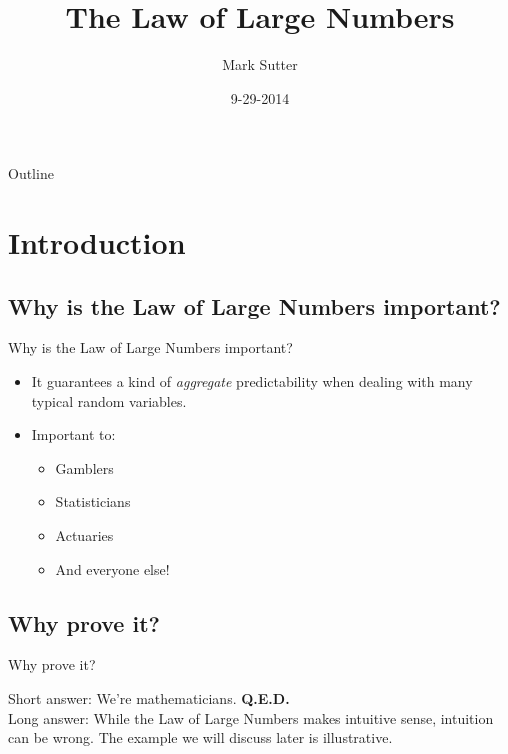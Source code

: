 \documentclass[9pt]{beamer}
\author{Mark Sutter}
\title{The Law of Large Numbers}
\institute{Iowa State University}
\date{9-29-2014}
\begin{document}

\begin{frame}
\titlepage
\end{frame}

\begin{frame}{Outline}
\tableofcontents
\end{frame}

\section{Introduction}
\subsection{Why is the Law of Large Numbers important?}


\begin{frame}{Why is the Law of Large Numbers important?}


\begin{itemize}
  \item It guarantees a kind of \textit{aggregate} predictability when dealing with many typical random variables. 
\end{itemize}\pause

 \begin{itemize}
    \item Important to:
     \begin{itemize}
    \item Gamblers\pause
    \item Statisticians \pause
    \item Actuaries \pause
    \item And everyone else!
    \end{itemize}
 \end{itemize} 
\end{frame}

\subsection{Why prove it?}
\begin{frame}{Why prove it?}

Short answer: We're mathematicians. \textbf{Q.E.D.}
\\[.5in]
Long answer: While the Law of Large Numbers makes intuitive sense, intuition can be wrong. The example we will discuss later is illustrative. 

\end{frame}
\end{document}
